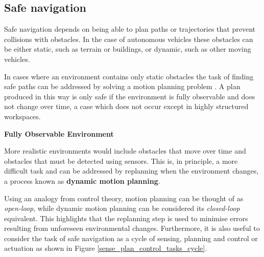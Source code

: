\subsection{Safe navigation}
\label{safe_navigation}

Safe navigation depends on being able to plan paths or trajectories that prevent collisions with
obstacles. In the case of autonomous vehicles these obstacles can be either static, such as
terrain or buildings, or dynamic, such as other moving vehicles.

In cases where an environment contains only static obstacles the task of finding safe paths
can be addressed by solving a motion planning problem \cite{LaValle2006}. A plan produced in this way
is only safe if the environment is fully observable and does not change over time, a case which
does not occur except in highly structured workspaces.

\begin{framed}
\theoremstyle{remark}
\begin{remark}{\textbf{Fully Observable Environment}}
 
\end{remark}
\end{framed}

More realistic environments would include obstacles that move over time and obstacles
that must be detected using sensors. This is, in principle, a more difficult task and 
can be addressed by replanning when the environment changes, a process known as \textbf{dynamic motion planning}.

Using an analogy from control theory, motion planning can be thought of as {\em open-loop},
while dynamic motion planning can be considered its {\em closed-loop} equivalent. This highlights that 
the replanning step is used to minimise errors resulting from unforeseen environmental changes. 
Furthermore, it is also useful to consider the task of safe navigation as a cycle of sensing, planning
and control or actuation as shown in Figure \ref{sense_plan_control_tasks_cycle}.

